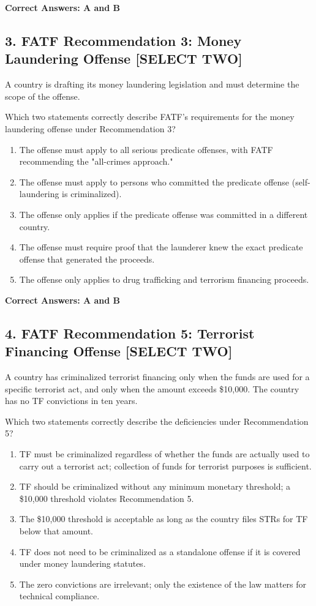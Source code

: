 \documentclass[11pt,a4paper]{article}
\begin{document}
	\textbf{Correct Answers: A and B}
	
	\subsection{3. FATF Recommendation 3: Money Laundering Offense \textnormal{[SELECT TWO]}}
	
	A country is drafting its money laundering legislation and must determine the scope of the offense.
	
	Which two statements correctly describe FATF's requirements for the money laundering offense under Recommendation 3?
	
	\begin{enumerate}[label=\Alph*.]
		\item The offense must apply to all serious predicate offenses, with FATF recommending the "all-crimes approach."
		\item The offense must apply to persons who committed the predicate offense (self-laundering is criminalized).
		\item The offense only applies if the predicate offense was committed in a different country.
		\item The offense must require proof that the launderer knew the exact predicate offense that generated the proceeds.
		\item The offense only applies to drug trafficking and terrorism financing proceeds.
	\end{enumerate}
	
	\textbf{Correct Answers: A and B}
	
	\subsection{4. FATF Recommendation 5: Terrorist Financing Offense \textnormal{[SELECT TWO]}}
	
	A country has criminalized terrorist financing only when the funds are used for a specific terrorist act, and only when the amount exceeds \$10,000. The country has no TF convictions in ten years.
	
	Which two statements correctly describe the deficiencies under Recommendation 5?
	
	\begin{enumerate}[label=\Alph*.]
		\item TF must be criminalized regardless of whether the funds are actually used to carry out a terrorist act; collection of funds for terrorist purposes is sufficient.
		\item TF should be criminalized without any minimum monetary threshold; a \$10,000 threshold violates Recommendation 5.
		\item The \$10,000 threshold is acceptable as long as the country files STRs for TF below that amount.
		\item TF does not need to be criminalized as a standalone offense if it is covered under money laundering statutes.
		\item The zero convictions are irrelevant; only the existence of the law matters for technical compliance.
	\end{enumerate}
	
\end{document}
